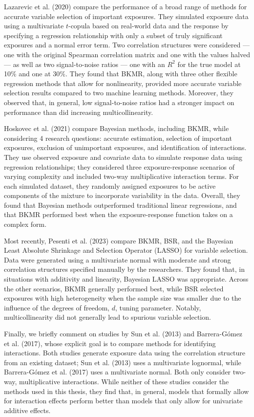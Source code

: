 \documentclass[12pt, twoside]{amherstthesis}
\begin{document}
Lazarevic et al. (2020) compare the performance of a broad range of methods for accurate variable selection of important exposures. They simulated exposure data using a multivariate \(t\)-copula based on real-world data and the response by specifying a regression relationship with only a subset of truly significant exposures and a normal error term. Two correlation structures were considered --- one with the original Spearman correlation matrix and one with the values halved --- as well as two signal-to-noise ratios --- one with an \(R^2\) for the true model at 10\% and one at 30\%. They found that BKMR, along with three other flexible regression methods that allow for nonlinearity, provided more accurate variable selection results compared to two machine learning methods. Moreover, they observed that, in general, low signal-to-noise ratios had a stronger impact on performance than did increasing multicollinearity.

Hoskovec et al. (2021) compare Bayesian methods, including BKMR, while considering 4 research questions: accurate estimation, selection of important exposures, exclusion of unimportant exposures, and identification of interactions. They use observed exposure and covariate data to simulate response data using regression relationships; they considered three exposure-response scenarios of varying complexity and included two-way multiplicative interaction terms. For each simulated dataset, they randomly assigned exposures to be active components of the mixture to incorporate variability in the data. Overall, they found that Bayesian methods outperformed traditional linear regressions, and that BKMR performed best when the exposure-response function takes on a complex form.

Most recently, Pesenti et al. (2023) compare BKMR, BSR, and the Bayesian Least Absolute Shrinkage and Selection Operator (LASSO) for variable selection. Data were generated using a multivariate normal with moderate and strong correlation structures specified manually by the researchers. They found that, in situations with additivity and linearity, Bayesian LASSO was appropriate. Across the other scenarios, BKMR generally performed best, while BSR selected exposures with high heterogeneity when the sample size was smaller due to the influence of the degrees of freedom, \(d\), tuning parameter. Notably, multicollinearity did not generally lead to spurious variable selection.

Finally, we briefly comment on studies by Sun et al. (2013) and Barrera-Gómez et al. (2017), whose explicit goal is to compare methods for identifying interactions. Both studies generate exposure data using the correlation structure from an existing dataset; Sun et al. (2013) uses a multivariate lognormal, while Barrera-Gómez et al. (2017) uses a multivariate normal. Both only consider two-way, multiplicative interactions. While neither of these studies consider the methods used in this thesis, they find that, in general, models that formally allow for interaction effects perform better than models that only allow for univariate additive effects.
\end{document}
